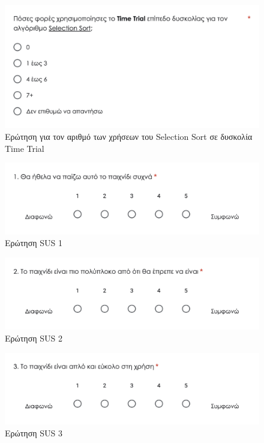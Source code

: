 \begin{figure}[H]
    \centering
    \includegraphics[width=0.8\linewidth]{sections/appendices/b/images/survey_selectionsort_timetrial_usages}
    \caption{Ερώτηση για τον αριθμό των χρήσεων του Selection Sort σε δυσκολία Time Trial}
    \label{fig:survey_selectionsort_timetrial_usages}
\end{figure}


\begin{figure}[H]
    \centering
    \includegraphics[width=0.8\linewidth]{sections/appendices/b/images/survey_sus_1}
    \caption{Ερώτηση SUS 1}
    \label{fig:survey_sus_1}
\end{figure}

\begin{figure}[H]
    \centering
    \includegraphics[width=0.8\linewidth]{sections/appendices/b/images/survey_sus_2}
    \caption{Ερώτηση SUS 2}
    \label{fig:survey_sus_2}
\end{figure}

\begin{figure}[H]
    \centering
    \includegraphics[width=0.8\linewidth]{sections/appendices/b/images/survey_sus_3}
    \caption{Ερώτηση SUS 3}
    \label{fig:survey_sus_3}
\end{figure}

